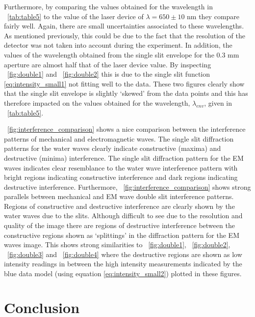 \documentclass{article}
\newcommand{\figref}[2][\figurename~]{#1\ref{#2}}
\newcommand{\tabref}[2][\tablename~]{#1\ref{#2}}
\begin{document}
\vspace{2mm}
\noindent
Furthermore, by comparing the values obtained for the wavelength in \tabref{tab:table5} to the value of the laser device of $\lambda = 650 \pm 10$ nm they compare fairly well. Again, there are small uncertainties associated to these wavelengths. As mentioned previously, this could be due to the fact that the resolution of the detector was not taken into account during the experiment. In addition, the values of the wavelength obtained from the single slit envelope for the 0.3 mm aperture are almost half that of the laser device value. By inspecting \figref{fig:double1} and \figref{fig:double2} this is due to the single slit function \eqref{eq:intensity_small1} not fitting well to the data. These two figures clearly show that the single slit envelope is slightly `skewed' from the data points and this has therefore impacted on the values obtained for the wavelength, $\lambda_{env}$, given in \tabref{tab:table5}.

\vspace{2mm}
\noindent
\figref{fig:interference_comparison} shows a nice comparison between the interference patterns of mechanical and electromagnetic waves. The single slit diffraction patterns for the water waves clearly indicate constructive (maxima) and destructive (minima) interference. The single slit diffraction pattern for the EM waves indicates clear resemblance to the water wave interference pattern with bright regions indicating constructive interference and dark regions indicating destructive interference. Furthermore, \figref{fig:interference_comparison} shows strong parallels between mechanical and EM wave double slit interference patterns. Regions of constructive and destructive interference are clearly shown by the water waves due to the slits. Although difficult to see due to the resolution and quality of the image there are regions of destructive interference between the constructive regions shown as `splittings' in the diffraction pattern for the EM waves image. This shows strong similarities to \figref{fig:double1}, \figref{fig:double2}, \figref{fig:double3} and \figref{fig:double4} where the destructive regions are shown as low intensity readings in between the high intensity measurements indicated by the blue data model (using equation \eqref{eq:intensity_small2}) plotted in these figures. 

\section{Conclusion}
\label{sec:conclusion}
\end{document}
